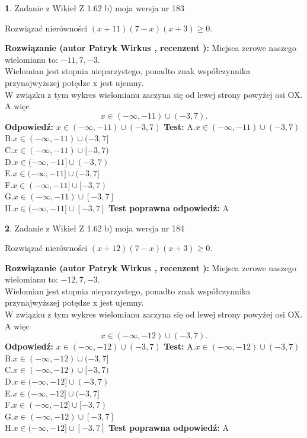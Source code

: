 \documentclass[12pt, a4paper]{article}
\theoremstyle{definition} %
\newtheorem{zad}{}
\newcommand{\zadStart}[1]{\begin{zad}#1\newline}
\newcommand{\zadStop}{\end{zad}}
\newcommand{\rozwStart}[2]{\noindent \textbf{Rozwiązanie (autor #1 , recenzent #2): }\newline}
\newcommand{\rozwStop}{\newline}
\newcommand{\odpStart}{\noindent \textbf{Odpowiedź:}\newline}
\newcommand{\odpStop}{\newline}
\newcommand{\testStart}{\noindent \textbf{Test:}\newline}
\newcommand{\testStop}{\newline}
\newcommand{\kluczStart}{\noindent \textbf{Test poprawna odpowiedź:}\newline}
\newcommand{\kluczStop}{\newline}
\begin{document}
\zadStart{Zadanie z Wikieł Z 1.62 b) moja wersja nr 183}

Rozwiązać nierówności $(x+11)(7-x)(x+3)\ge0$.
\zadStop
\rozwStart{Patryk Wirkus}{}
Miejsca zerowe naszego wielomianu to: $-11, 7, -3$.\\
Wielomian jest stopnia nieparzystego, ponadto znak współczynnika przy\linebreak najwyższej potędze x jest ujemny.\\ W związku z tym wykres wielomianu zaczyna się od lewej strony powyżej osi OX. A więc $$x \in (-\infty,-11) \cup (-3,7).$$
\rozwStop
\odpStart
$x \in (-\infty,-11) \cup (-3,7)$
\odpStop
\testStart
A.$x \in (-\infty,-11) \cup (-3,7)$\\
B.$x \in (-\infty,-11) \cup (-3,7]$\\
C.$x \in (-\infty,-11) \cup [-3,7)$\\
D.$x \in (-\infty,-11] \cup (-3,7)$\\
E.$x \in (-\infty,-11] \cup (-3,7]$\\
F.$x \in (-\infty,-11] \cup [-3,7)$\\
G.$x \in (-\infty,-11) \cup [-3,7]$\\
H.$x \in (-\infty,-11] \cup [-3,7]$
\testStop
\kluczStart
A
\kluczStop



\zadStart{Zadanie z Wikieł Z 1.62 b) moja wersja nr 184}

Rozwiązać nierówności $(x+12)(7-x)(x+3)\ge0$.
\zadStop
\rozwStart{Patryk Wirkus}{}
Miejsca zerowe naszego wielomianu to: $-12, 7, -3$.\\
Wielomian jest stopnia nieparzystego, ponadto znak współczynnika przy\linebreak najwyższej potędze x jest ujemny.\\ W związku z tym wykres wielomianu zaczyna się od lewej strony powyżej osi OX. A więc $$x \in (-\infty,-12) \cup (-3,7).$$
\rozwStop
\odpStart
$x \in (-\infty,-12) \cup (-3,7)$
\odpStop
\testStart
A.$x \in (-\infty,-12) \cup (-3,7)$\\
B.$x \in (-\infty,-12) \cup (-3,7]$\\
C.$x \in (-\infty,-12) \cup [-3,7)$\\
D.$x \in (-\infty,-12] \cup (-3,7)$\\
E.$x \in (-\infty,-12] \cup (-3,7]$\\
F.$x \in (-\infty,-12] \cup [-3,7)$\\
G.$x \in (-\infty,-12) \cup [-3,7]$\\
H.$x \in (-\infty,-12] \cup [-3,7]$
\testStop
\kluczStart
A
\kluczStop
\end{document}

